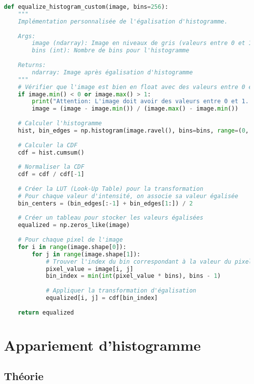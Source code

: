 \documentclass[12pt,a4paper]{article}
\begin{document}
\begin{lstlisting}[language=Python, caption=Implémentation de l'égalisation d'histogramme]
def equalize_histogram_custom(image, bins=256):
    """
    Implémentation personnalisée de l'égalisation d'histogramme.
    
    Args:
        image (ndarray): Image en niveaux de gris (valeurs entre 0 et 1)
        bins (int): Nombre de bins pour l'histogramme
        
    Returns:
        ndarray: Image après égalisation d'histogramme
    """
    # Vérifier que l'image est bien en float avec des valeurs entre 0 et 1
    if image.min() < 0 or image.max() > 1:
        print("Attention: L'image doit avoir des valeurs entre 0 et 1. Normalisation appliquée.")
        image = (image - image.min()) / (image.max() - image.min())
    
    # Calculer l'histogramme
    hist, bin_edges = np.histogram(image.ravel(), bins=bins, range=(0, 1))
    
    # Calculer la CDF
    cdf = hist.cumsum()
    
    # Normaliser la CDF
    cdf = cdf / cdf[-1]
    
    # Créer la LUT (Look-Up Table) pour la transformation
    # Pour chaque valeur d'intensité, on associe sa valeur égalisée
    bin_centers = (bin_edges[:-1] + bin_edges[1:]) / 2
    
    # Créer un tableau pour stocker les valeurs égalisées
    equalized = np.zeros_like(image)
    
    # Pour chaque pixel de l'image
    for i in range(image.shape[0]):
        for j in range(image.shape[1]):
            # Trouver l'index du bin correspondant à la valeur du pixel
            pixel_value = image[i, j]
            bin_index = min(int(pixel_value * bins), bins - 1)
            
            # Appliquer la transformation d'égalisation
            equalized[i, j] = cdf[bin_index]
    
    return equalized
\end{lstlisting}

\section{Appariement d'histogramme}

\subsection{Théorie}
\end{document}
